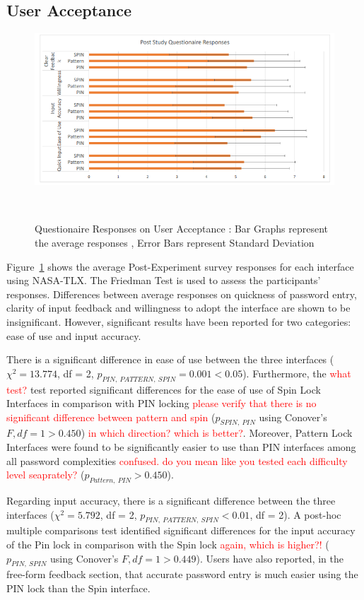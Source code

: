 \documentclass{sigchi}
\newcommand{\comment}[1]{\textcolor{red}{#1}}
\begin{document}
\subsection{User Acceptance}
\begin{figure}[b]
	\centering
	\includegraphics[width=1\columnwidth]{figures/Responses.png}
	\caption{Questionaire Responses on User Acceptance : Bar Graphs represent the average responses , Error Bars represent Standard Deviation}~\label{fig:Responses}
\end{figure}
 Figure~\ref{fig:Responses} shows the average Post-Experiment survey responses for each interface using NASA-TLX.  The Friedman Test is used to assess the participants' responses. Differences between average responses on quickness of password entry, clarity of input feedback and willingness to adopt the interface are shown to be insignificant. However, significant results have been reported for two categories: ease of use and input accuracy.

There is a significant difference in ease of use between the three interfaces ($\chi^{2} = 13.774$, df = 2, $p_{PIN,\:PATTERN, \:SPIN} = 0.001 < 0.05$).  Furthermore, the \comment{what test?} test reported significant differences for the ease of use of Spin Lock  Interfaces in comparison with PIN locking \comment{please verify that there is no significant difference between pattern and spin}  ($p_{SPIN,\:PIN}$ using Conover's $F, df = 1 >  0.450$) \comment{in which direction? which is better?}.  Moreover, Pattern Lock Interfaces were found to be significantly easier to use than PIN interfaces among all password complexities \comment{confused. do you mean like you tested each difficulty level seaprately?} ($p_{Pattern,\:PIN} > 0.450$). 

Regarding input accuracy, there is a significant difference between the three interfaces ($\chi^{2} = 5.792$, df = 2, $p_{PIN,\:PATTERN, \:SPIN} < 0.01$, df = 2). A post-hoc multiple comparisons test identified significant differences for the input accuracy of the Pin lock in comparison with the Spin lock \comment{again, which is higher?!} ($p_{PIN,\:SPIN}$ using Conover's $F, df = 1 >  0.449$).  Users have also reported, in the free-form feedback section, that accurate password entry is much easier using the PIN lock than the Spin interface.
\end{document}
